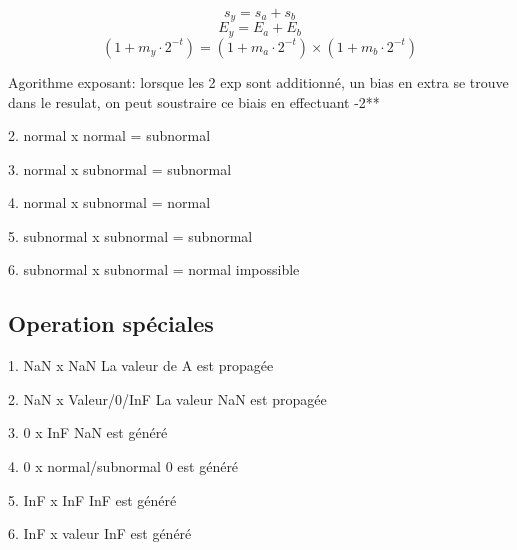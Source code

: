 \documentclass[letterpaper, 12pt]{article}
\begin{document}
$$ s_y = s_a + s_b $$
$$ E_y = E_a + E_b $$
$$ (1 + m_y\cdot2^{-t}) = (1 + m_a \cdot 2^{-t}) \times (1 + m_b \cdot 2^{-t})$$

Agorithme exposant:
lorsque les 2 exp sont additionné, un bias en extra se trouve dans le resulat, on peut soustraire ce biais en effectuant -2**


2. normal x normal = subnormal

3. normal x subnormal = subnormal

4. normal x subnormal = normal

5. subnormal x subnormal = subnormal

6. subnormal x subnormal = normal
impossible
\subsection{Operation spéciales}
1.  NaN x NaN
La valeur de A est propagée

2. NaN x Valeur/0/InF
La valeur NaN est propagée

3. 0 x InF
NaN est généré

4. 0 x normal/subnormal
0 est généré

5. InF x InF
InF est généré

6. InF x valeur
InF est généré

%
%
%
\end{document}
